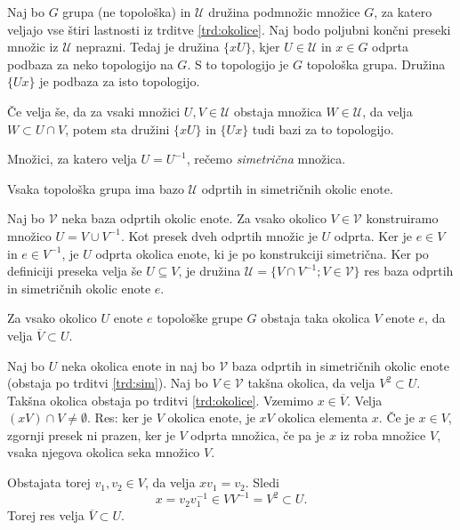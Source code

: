 \documentclass[mat1]{fmfdelo}
\newcommand{\Ucurl}{\mathcal{U}}
\newcommand{\closure}[1]{\overline{#1}}
\begin{document}
\begin{trditev}\label{trd:okolice2}
Naj bo $G$ grupa (ne topološka) in $\Ucurl$ družina podmnožic množice $G$, za katero veljajo vse štiri lastnosti iz trditve \ref{trd:okolice}. Naj bodo poljubni končni preseki množic iz $\Ucurl$ neprazni. Tedaj je družina $\lbrace xU \rbrace$, kjer $U \in \Ucurl$ in $x \in G$ odprta podbaza za neko topologijo na $G$. S to topologijo je $G$ topološka grupa. Družina $\lbrace Ux \rbrace$ je podbaza za isto topologijo.

Če velja še, da za vsaki množici $U,V \in \Ucurl$ obstaja množica $W \in \Ucurl$, da velja $W \subset U \cap V$, potem sta družini $\lbrace xU \rbrace$ in $\lbrace Ux \rbrace$ tudi bazi za to topologijo.
\end{trditev}

\begin{definicija}\label{def:sim}
Množici, za katero velja $U = U^{-1}$, rečemo \emph{simetrična} množica.
\end{definicija}

\begin{trditev}\label{trd:sim}
Vsaka topološka grupa ima bazo $\Ucurl$ odprtih in simetričnih okolic enote.
\end{trditev}

\begin{dokaz}
Naj bo $\mathcal{V}$ neka baza odprtih okolic enote. Za vsako okolico $V \in \mathcal{V}$ konstruiramo množico $U = V \cup V^{-1}$. Kot presek dveh odprtih množic je $U$ odprta. Ker je $e \in V$ in $e \in V^{-1}$, je $U$ odprta okolica enote, ki je po konstrukciji simetrična. Ker po definiciji preseka velja še $U \subseteq V$, je družina $\Ucurl = \lbrace V \cap V^{-1}; V \in \mathcal{V} \rbrace$ res baza odprtih in simetričnih okolic enote $e$.
\end{dokaz}

\begin{posledica}\label{pos:sim}
Za vsako okolico $U$ enote $e$ topološke grupe $G$ obstaja taka okolica $V$ enote $e$, da velja $\closure{V} \subset U$.
\end{posledica}

\begin{dokaz}
Naj bo $U$ neka okolica enote in naj bo $\mathcal{V}$ baza odprtih in simetričnih okolic enote (obstaja po trditvi \ref{trd:sim}). Naj bo $V \in \mathcal{V}$ takšna okolica, da velja $V^2 \subset U$. Takšna okolica obstaja po trditvi \ref{trd:okolice}. Vzemimo $x \in \closure{V}$. Velja $(xV) \cap V \neq \emptyset$.
Res: ker je $V$ okolica enote, je $xV$ okolica elementa $x$. Če je $x \in V$, zgornji presek ni prazen, ker je $V$ odprta množica, če pa je $x$ iz roba množice $V$, vsaka njegova okolica seka množico $V$.

Obstajata torej $v_1, v_2 \in V$, da velja $x v_1 = v_2$. Sledi \[x = v_2 v_1^{-1} \in VV^{-1} = V^2 \subset U.\]
Torej res velja $\closure{V} \subset U$.
\end{dokaz}
\end{document}
